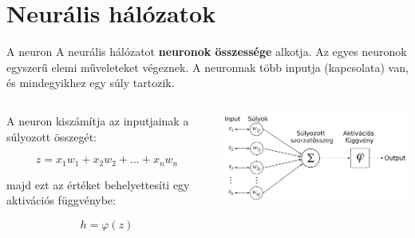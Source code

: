 \documentclass[english, aspectratio=169]{beamer}
\makeatletter
\let\origtableofcontents=\tableofcontents
\def\tableofcontents{\@ifnextchar[{\origtableofcontents}{\gobbletableofcontents}}
\def\gobbletableofcontents#1{\origtableofcontents}
\makeatother
\begin{document}
\section{Neurális hálózatok}

\begin{frame}
\tableofcontents[currentsection]
\end{frame}

\begin{frame}{A neuron}
A neurális hálózatot \textbf{neuronok összessége} alkotja. Az egyes neuronok egyszerű elemi műveleteket végeznek. A neuronnak több inputja (kapcsolata) van, és mindegyikhez egy súly tartozik.
\begin{columns}
\begin{column}{.4\textwidth}
A neuron kiszámítja az inputjainak a súlyozott összegét:
\begin{block}{}
\vspace{-0.7cm}
\[
z=x_1w_1 + x_2w_2 + ... + x_nw_n
\]
\end{block}
majd ezt az értéket behelyettesíti egy aktivációs függvénybe:
\begin{block}{}
\vspace{-0.2cm}
\[
h=\varphi(z)
\] 
\end{block}
\end{column}
\begin{column}{.6\textwidth}
\begin{center}
\includegraphics[width=9cm, keepaspectratio]{images/ql_21.png}
\end{center}
\end{column}
\end{columns}
\end{frame}
\end{document}
